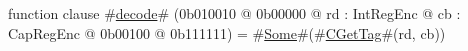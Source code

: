 function clause #\hyperref[zdecode]{decode}# (0b010010 @ 0b00000 @ rd : IntRegEnc @ cb : CapRegEnc @    0b00100 @ 0b111111) = #\hyperref[zSome]{Some}#(#\hyperref[zCGetTag]{CGetTag}#(rd, cb))
